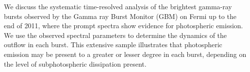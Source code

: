


\bigskip



\bigskip

\noindent We discuss the systematic time-resolved analysis of the brightest gamma-ray bursts observed by the Gamma ray Burst Monitor (GBM) on Fermi up to the end of 2011, where the prompt spectra show evidence for photospheric emission. We use the observed spectral parameters to determine the dynamics of the outflow in each burst. This extensive sample illustrates that photospheric emission may be present to a greater or lesser degree in each burst, depending on the level of subphotospheric dissipation present.

